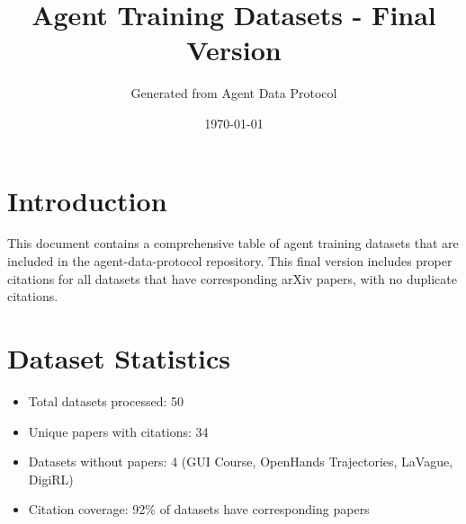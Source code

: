 \documentclass[11pt]{article}
\title{Agent Training Datasets - Final Version}
\author{Generated from Agent Data Protocol}
\date{\today}
\begin{document}
\maketitle

\section{Introduction}

This document contains a comprehensive table of agent training datasets that are included in the agent-data-protocol repository. This final version includes proper citations for all datasets that have corresponding arXiv papers, with no duplicate citations.

\section{Dataset Statistics}

\begin{itemize}
\item Total datasets processed: 50
\item Unique papers with citations: 34
\item Datasets without papers: 4 (GUI Course, OpenHands Trajectories, LaVague, DigiRL)
\item Citation coverage: 92\% of datasets have corresponding papers
\end{itemize}





\end{document}
